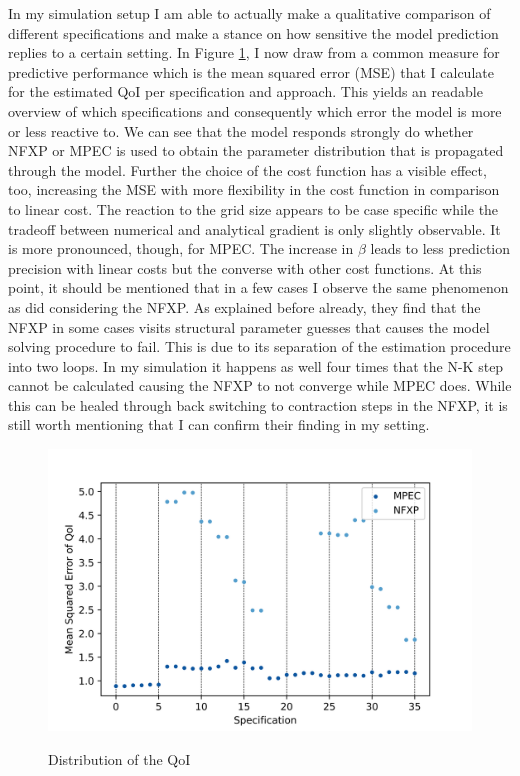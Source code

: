 In my simulation setup I am able to actually make a qualitative comparison of different specifications and make a stance on how sensitive the model prediction replies to a certain setting. In Figure \ref{figure10}, I now draw from a common measure for predictive performance which is the mean squared error (MSE) that I calculate for the estimated QoI per specification and approach. This yields an readable overview of which specifications and consequently which error the model is more or less reactive to. We can see that the model responds strongly do whether NFXP or MPEC is used to obtain the parameter distribution that is propagated through the model. Further the choice of the cost function has a visible effect, too, increasing the MSE with more flexibility in the cost function in comparison to linear cost. The reaction to the grid size appears to be case specific while the tradeoff between numerical and analytical gradient is only slightly observable. It is more pronounced, though, for MPEC. The increase in $\beta$ leads to less prediction precision with linear costs but the converse with other cost functions. At this point, it should be mentioned that in a few cases I observe the same phenomenon as \cite{Dong.Hsieh.Zhang.2017} did considering the NFXP. As explained before already, they find that the NFXP in some cases visits structural parameter guesses that causes the model solving procedure to fail. This is due to its separation of the estimation procedure into two loops. In my simulation it happens as well four times that the N-K step cannot be calculated causing the NFXP to not converge while MPEC does. While this can be healed through back switching to contraction steps in the NFXP, it is still worth mentioning that I can confirm their finding in my setting.


\begin{figure}[!b]
	\caption{Distribution of the QoI}
	\vspace*{-4mm}
	\centering
	\includegraphics[scale=0.9]{../figures/figure_10.png}
	\label{figure10}
\end{figure}


